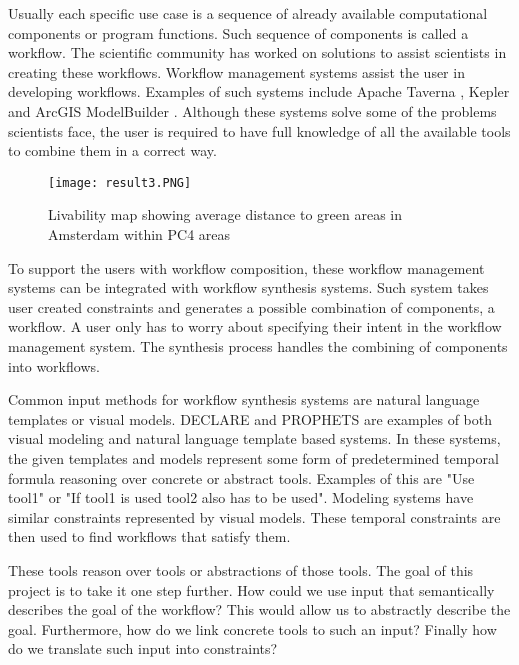 \documentclass{article}
\begin{document}
Usually each specific use case is a sequence of already available computational components or program functions. Such sequence of components is called a workflow. The scientific community has worked on solutions to assist scientists in creating these workflows. Workflow management systems assist the user in developing workflows. Examples of such systems include Apache Taverna \cite{wolstencroft2013taverna}, Kepler \cite{altintas2004kepler} and ArcGIS ModelBuilder \cite{allen2011getting}. Although these systems solve some of the problems scientists face, the user is required to have full knowledge of all the available tools to combine them in a correct way. 



\begin{figure}
  \centering
    \texttt{[image: result3.PNG]}
    \caption{Livability map showing average distance to green areas in Amsterdam within PC4 areas }
    \label{figure:livability}
\end{figure}

To support the users with workflow composition, these workflow management systems can be integrated with workflow synthesis systems. Such system takes user created constraints and generates a possible combination of components, a workflow. A user only has to worry about specifying their intent in the workflow management system. The synthesis process handles the combining of components into workflows. 

Common input methods for workflow synthesis systems are natural language templates or visual models. DECLARE \cite{pesic2007declare} and PROPHETS \cite{Prophets} are examples of both visual modeling and natural language template based systems. In these systems, the given templates and models represent some form of predetermined temporal formula reasoning over concrete or abstract tools. Examples of this are "Use tool1" or "If tool1 is used tool2 also has to be used". Modeling systems have similar constraints represented by visual models. These temporal constraints are then used to find workflows that satisfy them.


These tools reason over tools or abstractions of those tools. The goal of this project is to take it one step further. 
How could we use input that semantically describes the goal of the workflow? This would allow us to abstractly describe the goal. Furthermore, how do we link concrete tools to such an input? Finally how do we translate such input into constraints? 
\end{document}
